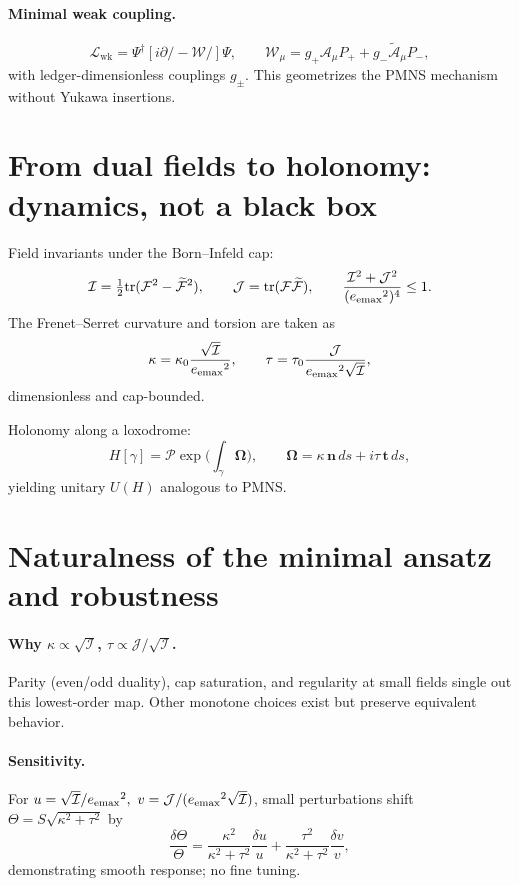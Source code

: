 \documentclass[coverpage]{qadi-article}
\begin{document}
\paragraph{Minimal weak coupling.}
\[
\mathcal L_{\text{wk}}
=\Psi^\dagger[i\partial\!\!\!/-\mathcal W\!\!\!/]\Psi,\qquad
\mathcal W_\mu=g_+\mathcal A_\mu P_+ + g_- \widetilde{\mathcal A}_\mu P_-,
\]
with ledger-dimensionless couplings \(g_\pm\).
This geometrizes the PMNS mechanism \cite{Maki1962,GribovPontecorvo1969} without Yukawa insertions.

\section{From dual fields to holonomy: dynamics, not a black box}
Field invariants under the Born--Infeld cap:
\begin{equation}
\mathcal I=\tfrac12\mathrm{tr}(\mathcal F^2-\widetilde{\mathcal F}^2),\qquad
\mathcal J=\mathrm{tr}(\mathcal F\widetilde{\mathcal F}),\qquad
\frac{\mathcal I^2+\mathcal J^2}{({e_{\mathrm{emax}}}^{2})^4}\le1.
\label{eq:BI}
\end{equation}
The Frenet–Serret curvature and torsion are taken as
\begin{equation}
\kappa=\kappa_0\frac{\sqrt{\mathcal I}}{{e_{\mathrm{emax}}}^{2}},\qquad
\tau=\tau_0\frac{\mathcal J}{{e_{\mathrm{emax}}}^{2}\sqrt{\mathcal I}},
\label{eq:kappatau}
\end{equation}
dimensionless and cap-bounded.

Holonomy along a loxodrome:
\[
H[\gamma]=\mathcal P\exp\!\Big(\int_\gamma\bm\Omega\Big),\qquad
\bm\Omega=\kappa\,\bm n\,ds+i\tau\,\bm t\,ds,
\]
yielding unitary \(U(H)\) analogous to PMNS.

\section{Naturalness of the minimal ansatz and robustness}
\paragraph{Why \(\kappa\!\propto\!\sqrt{\mathcal I}\), \(\tau\!\propto\!\mathcal J/\sqrt{\mathcal I}\).}
Parity (even/odd duality), cap saturation, and regularity at small fields single out this lowest-order map. Other monotone choices exist but preserve equivalent behavior.

\paragraph{Sensitivity.}
For \(u=\sqrt{\mathcal I}/\eemaxsq,\ v=\mathcal J/(\eemaxsq\sqrt{\mathcal I})\), small perturbations shift \(\Theta=S\sqrt{\kappa^2+\tau^2}\) by
\[
\frac{\delta\Theta}{\Theta}=
\frac{\kappa^2}{\kappa^2+\tau^2}\frac{\delta u}{u}+
\frac{\tau^2}{\kappa^2+\tau^2}\frac{\delta v}{v},
\]
demonstrating smooth response; no fine tuning.
\end{document}
